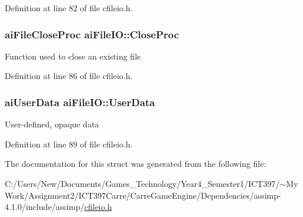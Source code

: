 Definition at line 82 of file cfileio.h.\hypertarget{structai_file_i_o_7ec702672712b5a02dc49cb17f980a14}{
\subsubsection[CloseProc]{\setlength{\rightskip}{0pt plus 5cm}aiFileCloseProc {\bf aiFileIO::CloseProc}}}
\label{structai_file_i_o_7ec702672712b5a02dc49cb17f980a14}


Function used to close an existing file 

Definition at line 86 of file cfileio.h.\hypertarget{structai_file_i_o_9c62b7f3d70fbb2f41e33ad0b9933139}{
\subsubsection[UserData]{\setlength{\rightskip}{0pt plus 5cm}aiUserData {\bf aiFileIO::UserData}}}
\label{structai_file_i_o_9c62b7f3d70fbb2f41e33ad0b9933139}


User-defined, opaque data 

Definition at line 89 of file cfileio.h.

The documentation for this struct was generated from the following file:\begin{CompactItemize}
\item 
C:/Users/New/Documents/Games\_\-Technology/Year4\_\-Semester1/ICT397/$\sim$My Work/Assignment2/ICT397Carre/CarreGameEngine/Dependencies/assimp-4.1.0/include/assimp/\hyperlink{cfileio_8h}{cfileio.h}\end{CompactItemize}
